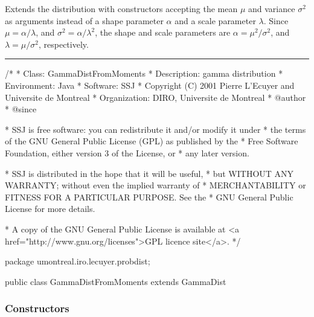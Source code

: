 
Extends the  distribution with constructors accepting the
mean $\mu$ and variance $\sigma^2$ as arguments instead of a shape parameter
$\alpha$ and a scale parameter $\lambda$.
Since $\mu=\alpha / \lambda$, and $\sigma^2=\alpha / \lambda^2$,
the shape and scale parameters are $\alpha=\mu^2 / \sigma^2$, and
$\lambda=\mu / \sigma^2$, respectively.

\bigskip\hrule

\begin{code}
\begin{hide}
/*
 * Class:        GammaDistFromMoments
 * Description:  gamma distribution
 * Environment:  Java
 * Software:     SSJ 
 * Copyright (C) 2001  Pierre L'Ecuyer and Universite de Montreal
 * Organization: DIRO, Universite de Montreal
 * @author       
 * @since

 * SSJ is free software: you can redistribute it and/or modify it under
 * the terms of the GNU General Public License (GPL) as published by the
 * Free Software Foundation, either version 3 of the License, or
 * any later version.

 * SSJ is distributed in the hope that it will be useful,
 * but WITHOUT ANY WARRANTY; without even the implied warranty of
 * MERCHANTABILITY or FITNESS FOR A PARTICULAR PURPOSE.  See the
 * GNU General Public License for more details.

 * A copy of the GNU General Public License is available at
   <a href="http://www.gnu.org/licenses">GPL licence site</a>.
 */
\end{hide}
package umontreal.iro.lecuyer.probdist;


public class GammaDistFromMoments extends GammaDist\begin{hide} {
\end{hide}
\end{code}
\subsubsection*{Constructors}

